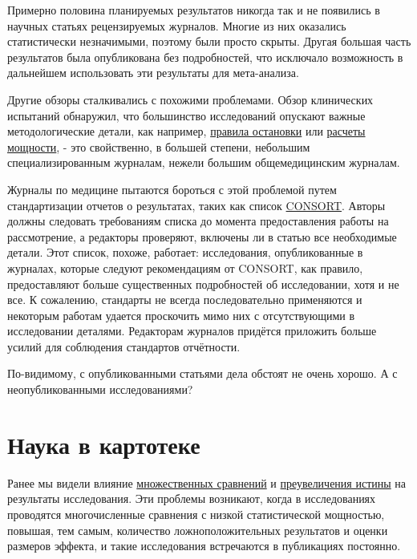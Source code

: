 Примерно половина планируемых результатов никогда так и не появились в научных статьях рецензируемых журналов. Многие из них оказались статистически незначимыми, поэтому были просто скрыты. Другая большая часть результатов была опубликована без подробностей, что исключало возможность в дальнейшем использовать эти результаты для мета-анализа. \cite{chan_empirical_2004} 


Другие обзоры сталкивались с похожими проблемами. Обзор клинических испытаний обнаружил, что большинство исследований опускают важные методологические детали, как например, \hyperref[chp7]{правила остановки} или \hyperref[chp3]{расчеты мощности}, - это свойственно, в большей степени, небольшим специализированным журналам, нежели большим общемедицинским журналам. \cite{huwiler-muntener_quality_2002}

Журналы по медицине пытаются бороться с этой проблемой путем стандартизации отчетов о результатах, таких как список \href{http://www.consort-statement.org/}{CONSORT}. Авторы должны следовать требованиям списка до момента предоставления работы на рассмотрение, а редакторы проверяют, включены ли в статью все необходимые детали. Этот список, похоже, работает: исследования, опубликованные в журналах, которые следуют рекомендациям от CONSORT, как правило, предоставляют больше существенных подробностей об исследовании, хотя и не все. \cite{plint_does_2006} К сожалению, стандарты не всегда последовательно применяются и некоторым работам удается проскочить мимо них с отсутствующими в исследовании деталями. \cite{mills_analysis_2005} Редакторам журналов придётся приложить больше усилий для соблюдения стандартов отчётности.

По-видимому, с опубликованными статьями дела обстоят не очень хорошо. А с неопубликованными исследованиями?


\section{Наука в картотеке}
\label{chp10:sciencecabinet}

Ранее мы видели влияние \hyperref[chp5:try-again]{множественных сравнений} и \hyperref[chp7:truthinflation]{преувеличения истины} на результаты исследования. Эти проблемы возникают, когда в исследованиях проводятся многочисленные сравнения с низкой статистической мощностью, повышая, тем самым, количество ложноположительных результатов и оценки размеров эффекта, и такие исследования встречаются в публикациях постоянно.

